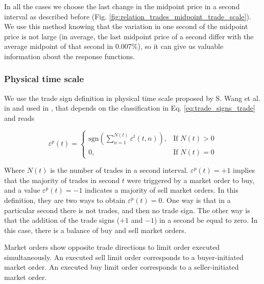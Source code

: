 In all the cases we choose the last change in the midpoint price in a second
interval as described before
(Fig. \ref{fig:relation_trades_midpoint_trade_scale}). We use this method
knowing that the variation in one second of the midpoint price is not large
(in average, the last midpoint price of a second differ with the average
midpoint of that second in $0.007\%$), so it can give us valuable information
about the response functions.

\subsubsection{Physical time scale}\label{subsubsec:physical_time}

We use the trade sign definition in physical time scale proposed by
S. Wang et al. in \cite{Wang_2016_cross} and used in
\cite{Wang_2017,Wang_2016_avg}, that depends on the classification in
Eq. \ref{eq:trade_signs_trade} and reads

\begin{equation}\label{eq:trade_signs_physical}
    \varepsilon^{p}\left(t\right)=\left\{
    \begin{array}{cc}
    \text{sgn}\left(\sum_{n=1}^{N\left(t\right)}\varepsilon^{t}
    \left(t,n\right)\right),
    & \text{If }N \left(t\right)>0\\
    0, & \text{If }N\left(t\right)=0
    \end{array}\right.
\end{equation}

Where $N \left(t \right)$ is the number of trades in a second interval.
$\varepsilon^{p}\left( t \right) = +1$ implies that the majority of
trades in second $t$ were triggered by a market order to buy, and a value
$\varepsilon^{p}\left( t \right) = -1$ indicates a majority of sell
market orders. In this definition, they are two ways to obtain
$\varepsilon^{p}\left( t \right) = 0$. One way is that in a particular
second there is not trades, and then no trade sign. The other  way is that the
addition of the trade signs ($+1$ and $-1$) in a second be equal to zero. In
this case, there is a balance of buy and sell market orders.

Market orders show opposite trade directions to limit order executed
simultaneously. An executed sell limit order corresponds to a buyer-initiated
market order. An executed buy limit order corresponds to a seller-initiated
market order.

